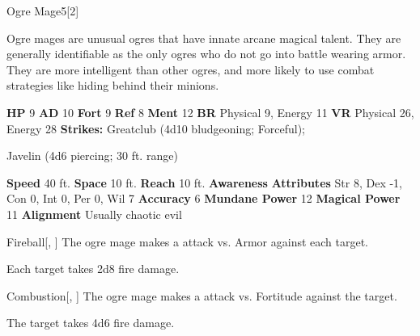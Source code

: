   \begin{monsubsection}{Ogre Mage}{5}[2]
    \vspace{-1em}\vspace{-1em}
    \vspace{0em}

    
          Ogre mages are unusual ogres that have innate arcane magical talent.
          They are generally identifiable as the only ogres who do not go into battle wearing armor.
          They are more intelligent than other ogres, and more likely to use combat strategies like hiding behind their minions.
        

    \begin{spellcontent}
      \begin{spelltargetinginfo}
        \pari \textbf{HP} 9 \monsep
          \textbf{AD} 10 \monsep
          \textbf{Fort} 9 \monsep
          \textbf{Ref} 8 \monsep
          \textbf{Ment} 12
        \pari \textbf{BR} Physical 9, Energy 11 \monsep
        \textbf{VR} Physical 26, Energy 28
        \pari \textbf{Strikes:}
            Greatclub  (4d10 bludgeoning; Forceful);
\par Javelin  (4d6 piercing; 30 ft. range)
      \end{spelltargetinginfo}
    \end{spellcontent}
    \begin{monsterfooter}
      \pari \textbf{Speed} 40 ft. \monsep
        \textbf{Space} 10 ft. \monsep
        \textbf{Reach} 10 ft.
      \pari \textbf{Awareness} 
      \pari \textbf{Attributes}
        Str 8, Dex -1,
        Con 0, Int 0,
        Per 0, Wil 7
      \pari \textbf{Accuracy} 6 \monsep
        \textbf{Mundane Power} 12 \monsep
      \textbf{Magical Power} 11
      \pari \textbf{Alignment} Usually chaotic evil
    \end{monsterfooter}
  \end{monsubsection}
  \begin{freeability}{Fireball}[, ]
       The ogre mage makes a  attack
        vs. Armor against each target.
    
    \hit Each target takes 2d8 fire damage.
    \end{freeability}
  

    \begin{freeability}{Combustion}[, ]
       The ogre mage makes a  attack
        vs. Fortitude against the target.
    
    \hit The target takes 4d6 fire damage.
    \end{freeability}
  

